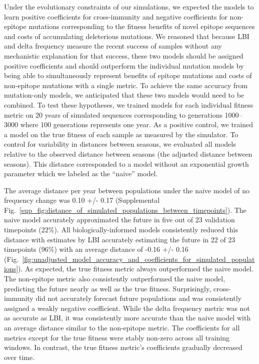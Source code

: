 Under the evolutionary constraints of our simulations, we expected the models to learn positive coefficients for cross-immunity and negative coefficients for non-epitope mutations corresponding to the fitness benefits of novel epitope sequences and costs of accumulating deleterious mutations.
We reasoned that because LBI and delta frequency measure the recent success of samples without any mechanistic explanation for that success, these two models should be assigned positive coefficients and should outperform the individual mutation models by being able to simultaneously represent benefits of epitope mutations and costs of non-epitope mutations with a single metric.
To achieve the same accuracy from mutation-only models, we anticipated that these two models would need to be combined.
To test these hypotheses, we trained models for each individual fitness metric on 20 years of simulated sequences corresponding to generations 1000--3000 where 100 generations represents one year.
As a positive control, we trained a model on the true fitness of each sample as measured by the simulator.
To control for variability in distances between seasons, we evaluated all models relative to the observed distance between seasons (the adjusted distance between seasons).
This distance corresponded to a model without an exponential growth parameter which we labeled as the ``naive'' model.

The average distance per year between populations under the naive model of no frequency change was 0.10 +/- 0.17 (Supplemental Fig.~\ref{sup_fig:distance_of_simulated_populations_between_timepoints}).
The naive model accurately approximated the future in five out of 23 validation timepoints (22\%).
All biologically-informed models consistently reduced this distance with estimates by LBI accurately estimating the future in 22 of 23 timepoints (96\%) with an average distance of -0.16 +/- 0.16 (Fig.~\ref{fig:unadjusted_model_accuracy_and_coefficients_for_simulated_populations}).
As expected, the true fitness metric always outperformed the naive model.
The non-epitope metric also consistently outperformed the naive model, predicting the future nearly as well as the true fitness.
Surprisingly, cross-immunity did not accurately forecast future populations and was consistently assigned a weakly negative coefficient.
While the delta frequency metric was not as accurate as LBI, it was consistently more accurate than the naive model with an average distance similar to the non-epitope metric.
The coefficients for all metrics except for the true fitness were stably non-zero across all training windows.
In contrast, the true fitness metric's coefficients gradually decreased over time.

